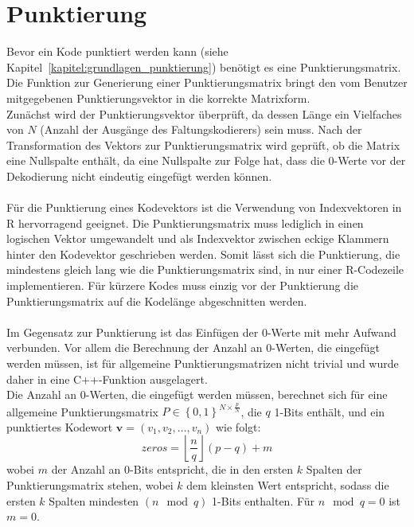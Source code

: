 \section{Punktierung}
\label{kapitel:implementierung_punktierung}
Bevor ein Kode punktiert werden kann (siehe Kapitel~\ref{kapitel:grundlagen_punktierung}) benötigt es eine Punktierungsmatrix. Die Funktion zur Generierung einer Punktierungsmatrix bringt den vom Benutzer mitgegebenen Punktierungsvektor in die korrekte Matrixform.
\\
Zunächst wird der Punktierungsvektor überprüft, da dessen Länge ein Vielfaches von $N$ (Anzahl der Ausgänge des Faltungskodierers) sein muss. Nach der Transformation des Vektors zur Punktierungsmatrix wird geprüft, ob die Matrix eine Nullspalte enthält, da eine Nullspalte zur Folge hat, dass die 0-Werte vor der Dekodierung nicht eindeutig eingefügt werden können.
\\
\\
Für die Punktierung eines Kodevektors ist die Verwendung von Indexvektoren in R hervorragend geeignet. Die Punktierungsmatrix muss lediglich in einen logischen Vektor umgewandelt und als Indexvektor zwischen eckige Klammern hinter den Kodevektor geschrieben werden. Somit lässt sich die Punktierung, die mindestens gleich lang wie die Punktierungsmatrix sind, in nur einer R-Codezeile implementieren. Für kürzere Kodes muss einzig vor der Punktierung die Punktierungsmatrix auf die Kodelänge abgeschnitten werden.
\\
\\
Im Gegensatz zur Punktierung ist das Einfügen der 0-Werte mit mehr Aufwand verbunden. Vor allem die Berechnung der Anzahl an 0-Werten, die eingefügt werden müssen, ist für allgemeine Punktierungsmatrizen nicht trivial und wurde daher in eine C++-Funktion ausgelagert.\\
Die Anzahl an 0-Werten, die eingefügt werden müssen, berechnet sich für eine allgemeine Punktierungsmatrix $P \in {\left\lbrace 0,1 \right\rbrace}^{N\times \frac{p}{N}}$, die $q$ 1-Bits enthält, und ein punktiertes Kodewort $\mathbf{v}=\left( v_{1},v_{2},\dots ,v_{n}\right)$ wie folgt:
\begin{equation}
\mathit{zeros} = \left\lfloor \frac{n}{q} \right\rfloor \left(p-q\right)+m
\label{eq:punktierung_zeros}
\end{equation}
wobei $m$ der Anzahl an 0-Bits entspricht, die in den ersten $k$ Spalten der Punktierungsmatrix stehen, wobei $k$ dem kleinsten Wert entspricht, sodass die ersten $k$ Spalten mindesten $\left( n\mod q\right)$ 1-Bits enthalten. Für $n\mod q=0$ ist $m=0$.
